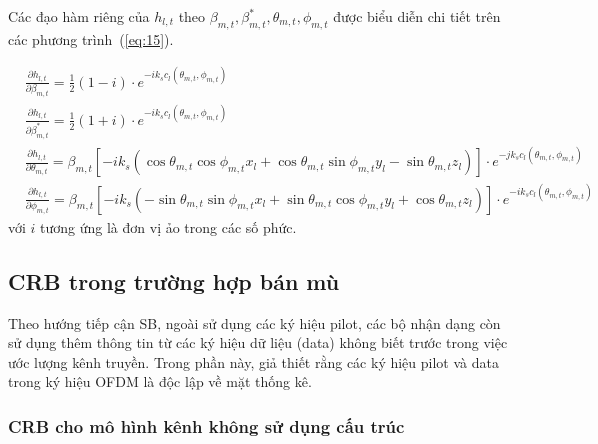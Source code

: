 Các đạo hàm riêng của $h_{l, t}$ theo $\beta_{m,t}, \beta^*_{m,t}, \theta_{m, t}, \phi_{m, t}$ được biểu diễn chi tiết trên các phương trình~(\ref{eq:15}).

\begin{subequations}
\label{eq:15}
    \begin{align}
    &\frac{\partial h_{l, t}}{\partial \beta_{m, t}}= \frac{1}{2} (1 - i) \cdot e^{-i k_s c_l(\theta_{m, t}, \phi_{m, t})} &  \\
    &\frac{\partial h_{l, t}}{\partial \beta^*_{m, t}}= \frac{1}{2} (1 + i) \cdot e^{-i k_s c_l(\theta_{m, t}, \phi_{m, t})} \\
    &\frac{\partial h_{l, t}}{\partial \theta_{m, t}}=
    \beta_{m, t} 
    [-i k_s (\cos\theta_{m, t} \cos\phi_{m, t} x_l + \cos\theta_{m, t} \sin\phi_{m, t} y_l
    - \sin \theta_{m, t} z_l)] \cdot e^{-j k_s c_l(\theta_{m, t}, \phi_{m, t})} \\ 
    &
    \frac{\partial h_{l, t}}{\partial \phi_{m, t}}=\beta_{m, t}
     [-i k_s (-\sin\theta_{m, t} \sin\phi_{m, t} x_l + \sin\theta_{m, t} \cos\phi_{m, t} y_l 
    + \cos \theta_{m, t} z_l)] \cdot e^{-i k_s c_l(\theta_{m, t}, \phi_{m, t})}
    \end{align}
\end{subequations}
với $i$ tương ứng là đơn vị ảo trong các số phức.

\subsection{CRB trong trường hợp bán mù}

Theo hướng tiếp cận SB, ngoài sử dụng các ký hiệu pilot, các bộ nhận dạng còn sử dụng thêm thông tin từ các ký hiệu dữ liệu (data) không biết trước trong việc ước lượng kênh truyền. Trong phần này, giả thiết rằng các ký hiệu pilot và data trong ký hiệu OFDM là độc lập về mặt thống kê. 

\subsubsection*{\textbf{CRB cho mô hình kênh không sử dụng cấu trúc}}

